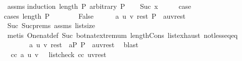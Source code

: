 \begin{isabellebody}
\isamarkupfalse%
\ assms\isanewline
{}\isamarkupfalse%
{\isacharparenleft}{\kern0pt}induction\ {\isachardoublequoteopen}length\ P{\isachardoublequoteclose}\ arbitrary{\isacharcolon}{\kern0pt}\ P{\isacharparenright}{\kern0pt}\isanewline
\ \ \isamarkupfalse%
\ {\isacharparenleft}{\kern0pt}Suc\ x{\isacharparenright}{\kern0pt}\isanewline
\ \ \isamarkupfalse%
\ \isamarkupfalse%
\ {\isacharquery}{\kern0pt}case\isanewline
\ \ \isamarkupfalse%
{\isacharparenleft}{\kern0pt}cases\ {\isachardoublequoteopen}length\ P\ {\isasymle}\ {}{\isachardoublequoteclose}{\isacharparenright}{\kern0pt}\isanewline
\ \ \ \ \isamarkupfalse%
\ False\isanewline
\ \ \ \ \isamarkupfalse%
\ {\isachardoublequoteopen}{\isasymexists}a\ u\ v\ rest{\isachardot}{\kern0pt}\ P\ {\isacharequal}{\kern0pt}\ {\isacharparenleft}{\kern0pt}a{\isacharhash}{\kern0pt}u{\isacharhash}{\kern0pt}v{\isacharhash}{\kern0pt}rest{\isacharparenright}{\kern0pt}{\isachardoublequoteclose}\ \isamarkupfalse%
\ Suc{\isacharparenleft}{\kern0pt}{}{\isacharparenright}{\kern0pt}\ Suc{\isachardot}{\kern0pt}prems{\isacharparenleft}{\kern0pt}{}{\isacharparenright}{\kern0pt}\ assms{\isacharparenleft}{\kern0pt}{}{\isacharparenright}{\kern0pt}\ list{\isachardot}{\kern0pt}size{\isacharparenleft}{\kern0pt}{}{\isacharparenright}{\kern0pt}\isanewline
\ \ \ \ \ \ \isamarkupfalse%
\ {\isacharparenleft}{\kern0pt}metis\ One{\isacharunderscore}{\kern0pt}nat{\isacharunderscore}{\kern0pt}def\ Suc{\isacharunderscore}{\kern0pt}{}\ bot{\isacharunderscore}{\kern0pt}nat{\isacharunderscore}{\kern0pt}{}{\isachardot}{\kern0pt}extremum\ length{\isacharunderscore}{\kern0pt}Cons\ list{\isachardot}{\kern0pt}exhaust\ not{\isacharunderscore}{\kern0pt}less{\isacharunderscore}{\kern0pt}eq{\isacharunderscore}{\kern0pt}eq{\isacharparenright}{\kern0pt}\isanewline
\ \ \ \ \isamarkupfalse%
\ \isamarkupfalse%
\ a\ u\ v\ rest\ \ aP{\isacharcolon}{\kern0pt}\ {\isachardoublequoteopen}P\ {\isacharequal}{\kern0pt}\ {\isacharparenleft}{\kern0pt}a{\isacharhash}{\kern0pt}u{\isacharhash}{\kern0pt}v{\isacharhash}{\kern0pt}rest{\isacharparenright}{\kern0pt}{\isachardoublequoteclose}\ \isamarkupfalse%
\ blast\isanewline
\ \ \ \ \isamarkupfalse%
\ {\isachardoublequoteopen}{\isasymnot}\ cc\ a\ u\ v\ {\isasymor}\ {\isasymnot}\ list{\isacharunderscore}{\kern0pt}check\ cc\ {\isacharparenleft}{\kern0pt}u{\isacharhash}{\kern0pt}v{\isacharhash}{\kern0pt}rest{\isacharparenright}{\kern0pt}{\isachardoublequoteclose}\ \isamarkupfalse%

\end{isabellebody}

